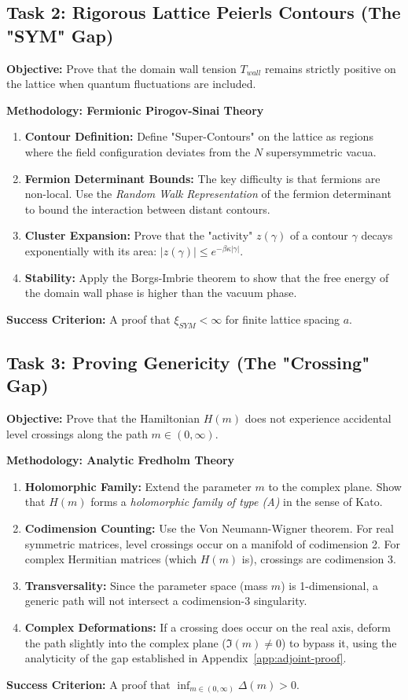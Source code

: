 \subsection{Task 2: Rigorous Lattice Peierls Contours (The "SYM" Gap)}
\textbf{Objective:} Prove that the domain wall tension $T_{wall}$ remains strictly positive on the lattice when quantum fluctuations are included.

\textbf{Methodology: Fermionic Pirogov-Sinai Theory}
\begin{enumerate}
    \item \textbf{Contour Definition:} Define "Super-Contours" on the lattice as regions where the field configuration deviates from the $N$ supersymmetric vacua.
    \item \textbf{Fermion Determinant Bounds:} The key difficulty is that fermions are non-local. Use the \textit{Random Walk Representation} of the fermion determinant to bound the interaction between distant contours.
    \item \textbf{Cluster Expansion:} Prove that the "activity" $z(\gamma)$ of a contour $\gamma$ decays exponentially with its area: $|z(\gamma)| \le e^{-\beta \kappa |\gamma|}$.
    \item \textbf{Stability:} Apply the Borgs-Imbrie theorem to show that the free energy of the domain wall phase is higher than the vacuum phase.
\end{enumerate}
\textbf{Success Criterion:} A proof that $\xi_{SYM} < \infty$ for finite lattice spacing $a$.

\subsection{Task 3: Proving Genericity (The "Crossing" Gap)}
\textbf{Objective:} Prove that the Hamiltonian $H(m)$ does not experience accidental level crossings along the path $m \in (0, \infty)$.

\textbf{Methodology: Analytic Fredholm Theory}
\begin{enumerate}
    \item \textbf{Holomorphic Family:} Extend the parameter $m$ to the complex plane. Show that $H(m)$ forms a \textit{holomorphic family of type (A)} in the sense of Kato.
    \item \textbf{Codimension Counting:} Use the Von Neumann-Wigner theorem. For real symmetric matrices, level crossings occur on a manifold of codimension 2. For complex Hermitian matrices (which $H(m)$ is), crossings are codimension 3.
    \item \textbf{Transversality:} Since the parameter space (mass $m$) is 1-dimensional, a generic path will not intersect a codimension-3 singularity.
    \item \textbf{Complex Deformations:} If a crossing does occur on the real axis, deform the path slightly into the complex plane ($\Im(m) \neq 0$) to bypass it, using the analyticity of the gap established in Appendix~\ref{app:adjoint-proof}.
\end{enumerate}
\textbf{Success Criterion:} A proof that $\inf_{m \in (0, \infty)} \Delta(m) > 0$.

